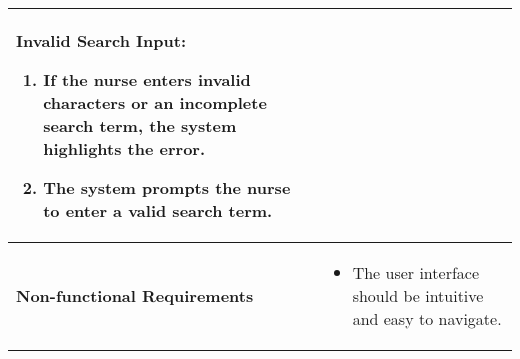 \documentclass{article}
\begin{document}
\begin{longtable}{| p{5cm} | p{10cm} |}
    \textbf{Invalid Search Input:}  
    \begin{enumerate}
        \item If the nurse enters invalid characters or an incomplete search term, the system highlights the error.
        \item The system prompts the nurse to enter a valid search term.
    \end{enumerate} \\
    \hline
    \textbf{Non-functional Requirements} & 
    \begin{itemize}
        \item The user interface should be intuitive and easy to navigate.
    \end{itemize} \\
    \hline
\end{longtable}

\renewcommand{\arraystretch}{1.3} %
\end{document}
